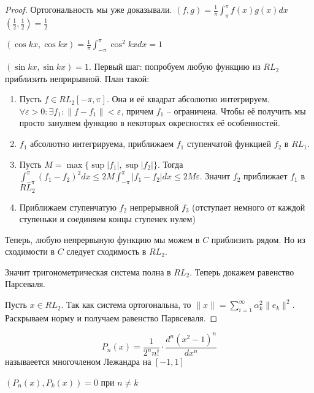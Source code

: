 \documentclass[document.tex]{subfiles}
\begin{document}
\begin{proof}
    Ортогональность мы уже доказывали. $(f, g) = \frac{1}{\pi}\int_{\pi}^{\pi}f(x)g(x)dx$
    $(\frac{1}{2}, \frac{1}{2}) = \frac{1}{2}$

    $(\cos kx, \cos kx) = \frac{1}{\pi}\int_{-\pi}^{\pi}\cos^2 kx dx = 1$

    $(\sin kx, \sin kx) = 1$.
    Первый шаг: попробуем любую функцию из $RL_2$ приблизить неприрывной. План такой:
    \begin{enumerate}
        \item Пусть $f \in RL_2[-\pi, \pi]$. Она и её квадрат абсолютно интегрируем. $\forall \varepsilon > 0: \exists
            f_1: \|f - f_1\| < \varepsilon$, причем $f_1$ -- ограничена. Чтобы её получить мы просто зануляем функцию в
            некоторых окресностях её особенностей.

        \item $f_1$ абсолютно интегрируема, приближаем $f_1$ ступенчатой функцией $f_2$ в $RL_1$.
        \item Пусть $M = \max \{\sup |f_1|, \sup |f_2|\}$. Тогда $\int_{-\pi}^{\pi}(f_1 - f_2)^2dx \leq 2M
            \int_{-\pi}^{\pi}|f_1 - f_2|dx \leq 2M \varepsilon$. Значит $f_2$ приближает $f_1$ в $RL_2$
        \item Приближаем ступенчатую $f_2$ непрерывной $f_3$ (отступает немного от каждой ступеньки и соединяем концы ступенек
            нулем)
    \end{enumerate}

    Теперь, любую непрервыную функцию мы можем в $C$ приблизить рядом. Но из сходимости в $C$ следует сходимость в
    $RL_2$.

    Значит тригонометрическая система полна в $RL_2$. Теперь докажем равенство Парсеваля.

    Пусть $x \in RL_2$. Так как система ортогональна, то $\|x\| = \sum_{i = 1}^{\infty} \alpha_k^2 \|e_k\|^2$.
    Раскрываем норму и получаем равенство Парвсеваля.
\end{proof}

\begin{definition}
    \[
        P_n(x) = \frac{1}{2^{n}n!} \cdot \frac{d^n (x^2 - 1)^n}{dx^n}
    \] называеется многочленом Лежандра на $[-1, 1]$
\end{definition}

\begin{statement}
    $(P_n(x), P_k(x)) = 0$ при $n \neq k$
\end{statement}
\end{document}
